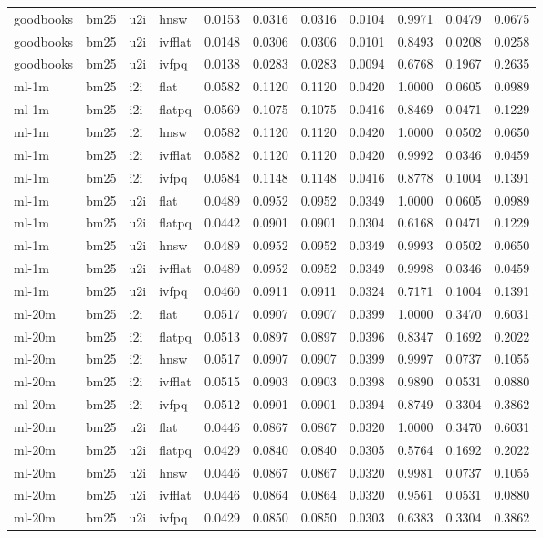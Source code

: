 \begin{tabular}{llllrrrrrrr}
goodbooks & bm25 & u2i & hnsw & 0.0153 & 0.0316 & 0.0316 & 0.0104 & 0.9971 & 0.0479 & 0.0675 \\
goodbooks & bm25 & u2i & ivfflat & 0.0148 & 0.0306 & 0.0306 & 0.0101 & 0.8493 & 0.0208 & 0.0258 \\
goodbooks & bm25 & u2i & ivfpq & 0.0138 & 0.0283 & 0.0283 & 0.0094 & 0.6768 & 0.1967 & 0.2635 \\
ml-1m & bm25 & i2i & flat & 0.0582 & 0.1120 & 0.1120 & 0.0420 & 1.0000 & 0.0605 & 0.0989 \\
ml-1m & bm25 & i2i & flatpq & 0.0569 & 0.1075 & 0.1075 & 0.0416 & 0.8469 & 0.0471 & 0.1229 \\
ml-1m & bm25 & i2i & hnsw & 0.0582 & 0.1120 & 0.1120 & 0.0420 & 1.0000 & 0.0502 & 0.0650 \\
ml-1m & bm25 & i2i & ivfflat & 0.0582 & 0.1120 & 0.1120 & 0.0420 & 0.9992 & 0.0346 & 0.0459 \\
ml-1m & bm25 & i2i & ivfpq & 0.0584 & 0.1148 & 0.1148 & 0.0416 & 0.8778 & 0.1004 & 0.1391 \\
ml-1m & bm25 & u2i & flat & 0.0489 & 0.0952 & 0.0952 & 0.0349 & 1.0000 & 0.0605 & 0.0989 \\
ml-1m & bm25 & u2i & flatpq & 0.0442 & 0.0901 & 0.0901 & 0.0304 & 0.6168 & 0.0471 & 0.1229 \\
ml-1m & bm25 & u2i & hnsw & 0.0489 & 0.0952 & 0.0952 & 0.0349 & 0.9993 & 0.0502 & 0.0650 \\
ml-1m & bm25 & u2i & ivfflat & 0.0489 & 0.0952 & 0.0952 & 0.0349 & 0.9998 & 0.0346 & 0.0459 \\
ml-1m & bm25 & u2i & ivfpq & 0.0460 & 0.0911 & 0.0911 & 0.0324 & 0.7171 & 0.1004 & 0.1391 \\
ml-20m & bm25 & i2i & flat & 0.0517 & 0.0907 & 0.0907 & 0.0399 & 1.0000 & 0.3470 & 0.6031 \\
ml-20m & bm25 & i2i & flatpq & 0.0513 & 0.0897 & 0.0897 & 0.0396 & 0.8347 & 0.1692 & 0.2022 \\
ml-20m & bm25 & i2i & hnsw & 0.0517 & 0.0907 & 0.0907 & 0.0399 & 0.9997 & 0.0737 & 0.1055 \\
ml-20m & bm25 & i2i & ivfflat & 0.0515 & 0.0903 & 0.0903 & 0.0398 & 0.9890 & 0.0531 & 0.0880 \\
ml-20m & bm25 & i2i & ivfpq & 0.0512 & 0.0901 & 0.0901 & 0.0394 & 0.8749 & 0.3304 & 0.3862 \\
ml-20m & bm25 & u2i & flat & 0.0446 & 0.0867 & 0.0867 & 0.0320 & 1.0000 & 0.3470 & 0.6031 \\
ml-20m & bm25 & u2i & flatpq & 0.0429 & 0.0840 & 0.0840 & 0.0305 & 0.5764 & 0.1692 & 0.2022 \\
ml-20m & bm25 & u2i & hnsw & 0.0446 & 0.0867 & 0.0867 & 0.0320 & 0.9981 & 0.0737 & 0.1055 \\
ml-20m & bm25 & u2i & ivfflat & 0.0446 & 0.0864 & 0.0864 & 0.0320 & 0.9561 & 0.0531 & 0.0880 \\
ml-20m & bm25 & u2i & ivfpq & 0.0429 & 0.0850 & 0.0850 & 0.0303 & 0.6383 & 0.3304 & 0.3862 \\
\bottomrule
\end{tabular}
